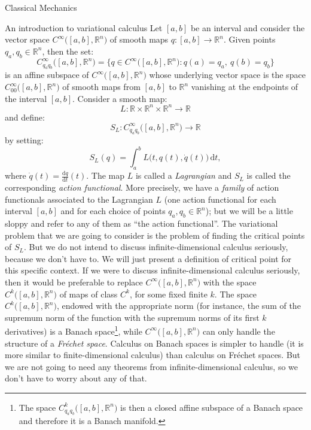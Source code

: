 \documentclass[oneside,a4paper,11pt]{amsbook}
\newcommand{\R}{\mathds R}
\newcommand{\dd}{\mathrm d}
\theoremstyle{remark}\newtheorem{exercise}{Exercise}[chapter]
\theoremstyle{plain}\newtheorem{teo}{Theorem}[section]
\theoremstyle{plain}\newtheorem{lem}[teo]{Lemma}
\theoremstyle{plain}\newtheorem{prop}[teo]{Proposition}
\theoremstyle{plain}\newtheorem{cor}[teo]{Corollary}
\theoremstyle{definition}\newtheorem{defin}[teo]{Definition}
\theoremstyle{remark}\newtheorem{rem}[teo]{Remark}
\theoremstyle{definition}\newtheorem{notation}[teo]{Notation}
\theoremstyle{definition}\newtheorem{convention}[teo]{Convention}
\theoremstyle{definition}\newtheorem{example}[teo]{Example}
\numberwithin{section}{chapter}
\numberwithin{equation}{section}
\begin{document}
\begin{chapter}{Classical Mechanics}
\begin{section}{An introduction to variational calculus}
Let $[a,b]$ be an interval and consider the vector space $C^\infty\big([a,b],\R^n\big)$ of smooth maps
$q:[a,b]\to\R^n$. Given points $q_a,q_b\in\R^n$, then the set:
\[C^\infty_{q_aq_b}\big([a,b],\R^n\big)=\big\{q\in C^\infty\big([a,b],\R^n\big):q(a)=q_a,\ q(b)=q_b\big\}\]
is an affine subspace of $C^\infty\big([a,b],\R^n\big)$ whose underlying vector space is the space
$C^\infty_{00}\big([a,b],\R^n\big)$ of smooth maps from $[a,b]$ to $\R^n$ vanishing at the endpoints of the
interval $[a,b]$. Consider a smooth map:
\[L:\R\times\R^n\times\R^n\longrightarrow\R\]
and define:
\[S_L:C^\infty_{q_aq_b}\big([a,b],\R^n)\longrightarrow\R\]
by setting:
\[S_L(q)=\int_a^bL\big(t,q(t),\dot q(t)\big)\,\dd t,\]
where $\dot q(t)=\frac{\dd q}{\dd t}(t)$. The map $L$ is called a {\em Lagrangian\/} and $S_L$ is called the
corresponding {\em action functional}. More precisely, we have a {\em family\/} of action functionals associated to the Lagrangian $L$
(one action functional for each interval $[a,b]$ and for each choice of points $q_a,q_b\in\R^n$); but we will be
a little sloppy and refer to any of them as ``the action functional''.
The variational problem that we are going to consider is the problem
of finding the critical points of $S_L$. But we do not intend to discuss infinite-dimensional calculus seriously,
because we don't have to. We will just present a definition of critical point for this specific context.
If we were to discuss infinite-dimensional calculus seriously, then it would be preferable to replace
$C^\infty\big([a,b],\R^n\big)$ with the space $C^k\big([a,b],\R^n\big)$ of maps of class $C^k$, for some fixed
finite $k$. The space $C^k\big([a,b],\R^n\big)$, endowed with the appropriate norm (for instance, the
sum of the supremum norm of the function with the supremum norms of its first $k$ derivatives) is a Banach space\footnote{%
The space $C^k_{q_aq_b}\big([a,b],\R^n\big)$ is then a closed affine subspace of a Banach space and therefore
it is a Banach manifold.}, while $C^\infty\big([a,b],\R^n\big)$ can only handle the structure of a {\em Fr\'echet space}.
Calculus on Banach spaces is simpler to handle (it is more similar to finite-dimensional calculus)
than calculus on Fr\'echet spaces. But we are not going to need any theorems from infinite-dimensional calculus,
so we don't have to worry about any of that.


\end{section}
\end{chapter}
\end{document}
